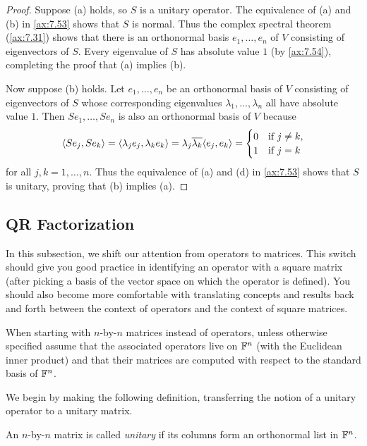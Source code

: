 \begin{proof}
Suppose (a) holds, so $S$ is a unitary operator. The equivalence of (a) and (b)
in \ref{ax:7.53} shows that $S$ is normal. Thus the complex spectral theorem
(\ref{ax:7.31}) shows that there is an orthonormal basis $e_1,\dots,e_n$ of $V$
consisting of eigenvectors of $S$. Every eigenvalue of $S$ has absolute value
$1$ (by \ref{ax:7.54}), completing the proof that (a) implies (b).

Now suppose (b) holds. Let $e_1,\dots,e_n$ be an orthonormal basis of $V$
consisting of eigenvectors of $S$ whose corresponding eigenvalues
$\lambda_1,\dots,\lambda_n$ all have absolute value $1$. Then $Se_1,\dots,Se_n$
is also an orthonormal basis of $V$ because
\[ \langle Se_j, Se_k \rangle=\langle \lambda_je_j, \lambda_ke_k \rangle
   =\lambda_j\overline{\lambda_k}\langle e_j, e_k \rangle
   =\begin{cases}0&\text{if }j\ne k,\\1&\text{if }j=k\end{cases} \]
for all $j,k=1,\dots,n$. Thus the equivalence of (a) and (d) in \ref{ax:7.53}
shows that $S$ is unitary, proving that (b) implies (a).
\end{proof}

\subsection{QR Factorization}

In this subsection, we shift our attention from operators to matrices. This
switch should give you good practice in identifying an operator with a square
matrix (after picking a basis of the vector space on which the operator is
defined). You should also become more comfortable with translating concepts and
results back and forth between the context of operators and the context of
square matrices.

When starting with $n$-by-$n$ matrices instead of operators, unless otherwise
specified assume that the associated operators live on $\mathbb{F}^n$ (with the
Euclidean inner product) and that their matrices are computed with respect to
the standard basis of $\mathbb{F}^n$.

We begin by making the following definition, transferring the notion of a
unitary operator to a unitary matrix.

\begin{definition}\label{ax:7.56}
An $n$-by-$n$ matrix is called \emph{unitary} if its columns form an orthonormal
list in $\mathbb{F}^n$.
\end{definition}

